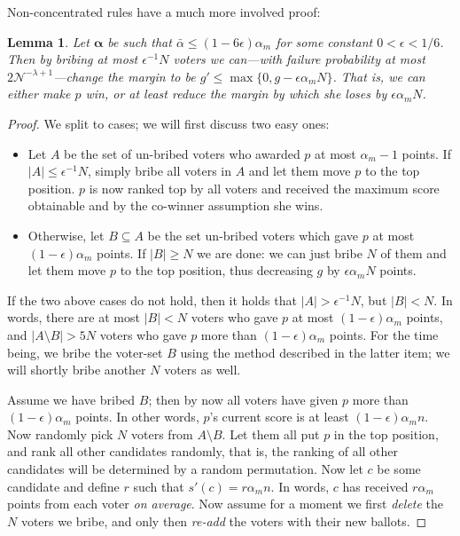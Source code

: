 \documentclass[letterpaper]{article} %
\newtheorem{lemma}[theorem]{Lemma}
\theoremstyle{definition}
\newcommand{\abs}[1]{\lvert #1 \rvert}
\newcommand{\NN}{\mathcal{N}}
\newcommand\vecgreek{\bm}
\newcommand{\veca}{\vecgreek{\alpha}}
\begin{document}
Non-concentrated rules have a much more involved proof:
\begin{lemma}\label{lem:how-to-bribe}
	Let $\veca$ be such that $\bar{\alpha} \leq (1-6\epsilon) \alpha_m$ for some constant $0 < \epsilon < 1/6$.
	 Then by bribing at most $\epsilon^{-1}N$ voters we can---with failure probability at most $2\NN^{-\lambda+1}$---change the margin to be $g' \leq \max\{0, g - \epsilon \alpha_m N\}$. That is, we can either make $p$ win, or at least reduce the margin by which she loses by $\epsilon \alpha_m N$.
\end{lemma}
\begin{proof}	We split to cases; we will first discuss two easy ones:
	\begin{itemize}
		\item Let $A$ be the set of un-bribed voters who awarded $p$ at most $\alpha_m -1$ points. If $\abs{A} \leq \epsilon^{-1}N$, simply bribe all voters in $A$ and let them move $p$ to the top position. $p$ is now ranked top by all voters and received the maximum score obtainable and by the co-winner assumption she wins.

		\item Otherwise, let $B \subseteq A$ be the set un-bribed voters which gave $p$ at most $(1-\epsilon) \alpha_m$ points. If $\abs{B} \geq N$ we are done: we can just bribe $N$ of them and let them move $p$ to the top position, thus decreasing $g$ by $\epsilon \alpha_m N$ points.
	\end{itemize}
	If the two above cases do not hold, then it holds that $\abs{A} > \epsilon^{-1}N$, but $\abs{B} < N$. In words, there are at most $\abs{B} < N$ voters who gave $p$ at most $(1-\epsilon) \alpha_m$ points, and $\abs{A \setminus B} > 5N$ voters who gave $p$ more than $(1-\epsilon) \alpha_m$ points. For the time being, we bribe the voter-set $B$ using the method described in the latter item; we will shortly bribe another $N$ voters as well.

	Assume we have bribed $B$; then by now all voters have given $p$ more than $(1-\epsilon) \alpha_m$ points. In other words, $p$'s current score is at least $(1-\epsilon) \alpha_m n$.
	Now randomly pick $N$  voters from $A\setminus B$. Let them all put $p$ in the top position, and rank all other candidates randomly, that is, the ranking of all other candidates will be determined by a random permutation. Now let $c$ be some candidate and define $r$ such that $s'(c)=r \alpha_m n$. In words, $c$ has received $r\alpha_m$ points from each voter \emph{on average}. Now assume for a moment we first \emph{delete} the $N$ voters we bribe, and only then \emph{re-add} the voters with their new ballots.


\end{proof}
\end{document}
